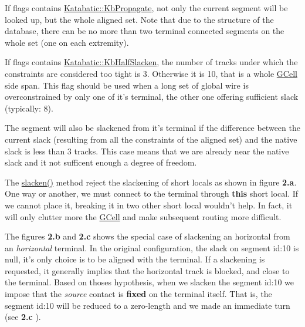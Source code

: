 If {\ttfamily flags} contains \hyperlink{namespaceKatabatic_a2af2ad6b6441614038caf59d04b3b217a3f95c1f06fe0b58b44ccbc57d99f2a5d}{Katabatic\-::\-Kb\-Propagate}, not only the current segment will be looked up, but the whole aligned set. Note that due to the structure of the database, there can be no more than two terminal connected segments on the whole set (one on each extremity).

If {\ttfamily flags} contains \hyperlink{namespaceKatabatic_a2af2ad6b6441614038caf59d04b3b217a1d6ccf82d04758a0922270d4f469066a}{Katabatic\-::\-Kb\-Half\-Slacken}, the number of tracks under which the constraints are considered too tight is 3. Otherwise it is 10, that is a whole \hyperlink{classKatabatic_1_1GCell}{G\-Cell} side span. This flag should be used when a long set of global wire is overconstrained by only one of it's terminal, the other one offering sufficient slack (typically\-: 8).

The segment will also be slackened from it's terminal if the difference between the current slack (resulting from all the constraints of the aligned set) and the native slack is less than 3 tracks. This case means that we are already near the native slack and it not sufficent enough a degree of freedom.

 The {\ttfamily \hyperlink{classKatabatic_1_1AutoSegment_a1fbc0adb4c0b14632edc7c55f028cd4b}{slacken()}} method reject the slackening of short locals as shown in figure {\bfseries 2.\-a}. One way or another, we must connect to the terminal through {\bfseries this} short local. If we cannot place it, breaking it in two other short local wouldn't help. In fact, it will only clutter more the \hyperlink{classKatabatic_1_1GCell}{G\-Cell} and make subsequent routing more difficult.

The figures {\bfseries 2.\-b} and {\bfseries 2.\-c} shows the special case of slackening an horizontal from an {\itshape horizontal} terminal. In the original configuration, the slack on segment {\ttfamily id\-:10} is null, it's only choice is to be aligned with the terminal. If a slackening is requested, it generally implies that the horizontal track is blocked, and close to the terminal. Based on thoses hypothesis, when we slacken the segment {\ttfamily id\-:10} we impose that the {\itshape source} contact is {\bfseries fixed} on the terminal itself. That is, the segment {\ttfamily id\-:10} will be reduced to a zero-\/length and we made an immediate turn (see {\bfseries 2.\-c} ).

 

